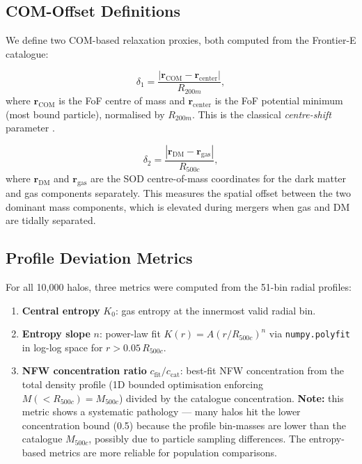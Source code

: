\documentclass[12pt,a4paper]{article}
\begin{document}
\subsection{COM-Offset Definitions}

We define two COM-based relaxation proxies, both computed from the Frontier-E catalogue:

\begin{equation}
  \delta_1 = \frac{|\mathbf{r}_\mathrm{COM} - \mathbf{r}_\mathrm{center}|}{R_{200m}},
\end{equation}
where $\mathbf{r}_\mathrm{COM}$ is the FoF centre of mass and $\mathbf{r}_\mathrm{center}$
is the FoF potential minimum (most bound particle), normalised by $R_{200m}$.
This is the classical \textit{centre-shift} parameter \citep[e.g.][]{neto2007}.

\begin{equation}
  \delta_2 = \frac{|\mathbf{r}_\mathrm{DM} - \mathbf{r}_\mathrm{gas}|}{R_{500c}},
\end{equation}
where $\mathbf{r}_\mathrm{DM}$ and $\mathbf{r}_\mathrm{gas}$ are the SOD centre-of-mass
coordinates for the dark matter and gas components separately.
This measures the spatial offset between the two dominant mass components,
which is elevated during mergers when gas and DM are tidally separated.

\subsection{Profile Deviation Metrics}

For all 10,000 halos, three metrics were computed from the 51-bin radial profiles:

\begin{enumerate}
  \item \textbf{Central entropy} $K_0$: gas entropy at the innermost valid radial bin.
  \item \textbf{Entropy slope} $n$: power-law fit $K(r) = A(r/R_{500c})^n$ via
        \texttt{numpy.polyfit} in log-log space for $r > 0.05\,R_{500c}$.
  \item \textbf{NFW concentration ratio} $c_\mathrm{fit}/c_\mathrm{cat}$: best-fit NFW
        concentration from the total density profile (1D bounded optimisation enforcing
        $M(<R_{500c}) = M_{500c}$) divided by the catalogue concentration.
        \textbf{Note:} this metric shows a systematic pathology --- many halos hit the
        lower concentration bound (0.5) because the profile bin-masses are lower than
        the catalogue $M_{500c}$, possibly due to particle sampling differences. The
        entropy-based metrics are more reliable for population comparisons.
\end{enumerate}
\end{document}

